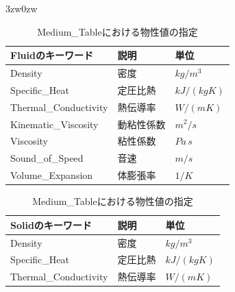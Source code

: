\begin{indentation}{3zw}{0zw}
\begin{table}[htdp]
\caption{Medium\_Tableにおける物性値の指定}
\begin{minipage}{.45\textwidth}
\begin{center}
\begin{tabular}{lll}\\ \toprule
Fluidのキーワード & 説明 & 単位\\ \midrule
Density & 密度 & $kg/m^3$\\
Specific\_Heat & 定圧比熱 & $kJ/(kg K)$\\
Thermal\_Conductivity & 熱伝導率 & $W/(m K)$\\
Kinematic\_Viscosity & 動粘性係数 & $m^2/s$\\
Viscosity & 粘性係数 & $Pa\,s$\\
Sound\_of\_Speed & 音速 & $m/s$\\
Volume\_Expansion & 体膨張率 & $1/K$\\ \bottomrule
\end{tabular}
\end{center}
\end{minipage} \hfill
\begin{minipage}{.45\textwidth}
\begin{center}
\begin{tabular}{lll}\\ \toprule
Solidのキーワード & 説明 & 単位\\ \midrule
Density & 密度 & $kg/m^3$\\
Specific\_Heat & 定圧比熱 & $kJ/(kg K)$\\
Thermal\_Conductivity & 熱伝導率 & $W/(m K)$\\ \bottomrule
\end{tabular}
\end{center}
\end{minipage}
\label{tbl:medium_tbl}
\end{table}

\end{indentation}

